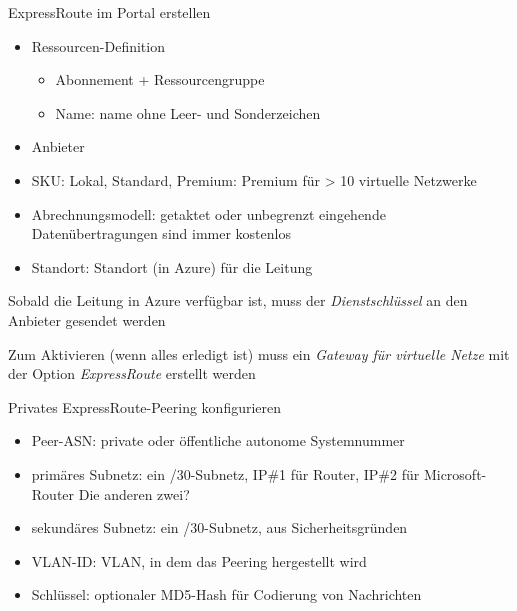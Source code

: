 \begin{flashcard}[Definition]{ExpressRoute im Portal erstellen}
    \begin{itemize}
        \item Ressourcen-Definition
            \begin{itemize}
                \item Abonnement + Ressourcengruppe
                \item Name: name ohne Leer- und Sonderzeichen
            \end{itemize}
        \item Anbieter
        \item SKU: Lokal, Standard, Premium: Premium für > 10 virtuelle Netzwerke
        \item Abrechnungsmodell: getaktet oder unbegrenzt\newline
            eingehende Datenübertragungen sind immer kostenlos
        \item Standort: Standort (in Azure) für die Leitung
    \end{itemize}
    Sobald die Leitung in Azure verfügbar ist, muss der \emph{Dienstschlüssel} an den Anbieter gesendet werden

    \vspace{1cm}
    Zum Aktivieren (wenn alles erledigt ist) muss ein \emph{Gateway für virtuelle Netze} mit der Option \emph{ExpressRoute} erstellt werden
\end{flashcard}

\begin{flashcard}[Definition]{Privates ExpressRoute-Peering konfigurieren}
    \begin{itemize}
        \item Peer-ASN: private oder öffentliche autonome Systemnummer
        \item primäres Subnetz: ein /30-Subnetz, IP\#1 für Router, IP\#2 für Microsoft-Router\newline
            Die anderen zwei?
        \item sekundäres Subnetz: ein /30-Subnetz, aus Sicherheitsgründen
        \item VLAN-ID: VLAN, in dem das Peering hergestellt wird
        \item Schlüssel: optionaler MD5-Hash für Codierung von Nachrichten
    \end{itemize}
\end{flashcard}


